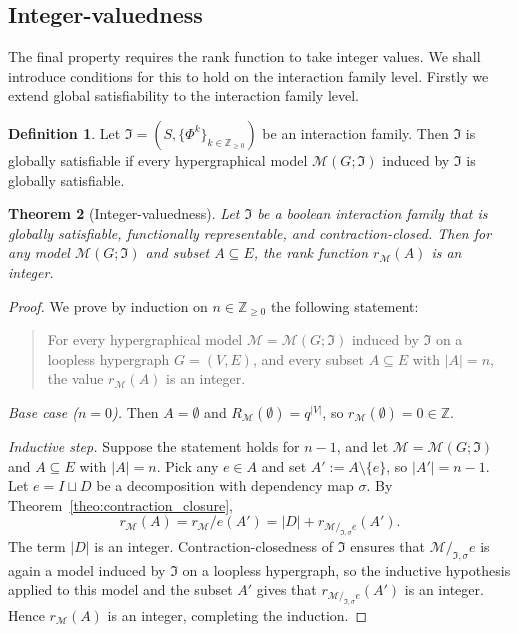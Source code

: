 \documentclass[11pt,reqno]{amsart}
\newcommand{\Mo}{\mathcal{M}}
\newcommand{\IFam}{\mathfrak{I}}
\theoremstyle{plain}
\newtheorem{theorem}{Theorem}[section]
\theoremstyle{definition}
\newtheorem{definition}[theorem]{Definition}
\numberwithin{equation}{section}
\begin{document}
\subsection{Integer-valuedness}
The final property requires the rank function to take integer values. We shall introduce conditions for this to hold on the interaction family level. Firstly we extend global satisfiability to the interaction family level.

\begin{definition}
    Let $\IFam = (S, \{\Phi^k\}_{k \in \mathbb{Z}_{\geq 0}})$ be an interaction family. Then $\IFam$ is globally satisfiable if every hypergraphical model $\Mo(G; \IFam)$ induced by $\IFam$ is globally satisfiable.
\end{definition}
 
\begin{theorem}[Integer-valuedness]
\label{thm:structural_integer_rank}
Let $\IFam$ be a boolean interaction family that is globally satisfiable, functionally representable, and contraction-closed.
Then for any model $\Mo(G; \IFam)$ and subset $A \subseteq E$, the rank function $r_{\Mo}(A)$ is an integer.
\end{theorem}
\begin{proof}
We prove by induction on $n \in \mathbb{Z}_{\geq 0}$ the following statement:
\begin{quote}
    For every hypergraphical model $\Mo = \Mo(G; \IFam)$ induced by $\IFam$ on a loopless hypergraph $G = (V, E)$, and every subset $A \subseteq E$ with $|A| = n$, the value $r_{\Mo}(A)$ is an integer.
\end{quote}

\emph{Base case ($n = 0$).} Then $A = \emptyset$ and $R_{\Mo}(\emptyset) = q^{|V|}$, so $r_{\Mo}(\emptyset) = 0 \in \mathbb{Z}$.

\emph{Inductive step.} Suppose the statement holds for $n - 1$, and let $\Mo = \Mo(G; \IFam)$ and $A \subseteq E$ with $|A| = n$. Pick any $e \in A$ and set $A' := A \setminus \{e\}$, so $|A'| = n - 1$. Let $e = I \sqcup D$ be a decomposition with dependency map $\sigma$. By Theorem~\ref{theo:contraction_closure},
\[
    r_{\Mo}(A) = r_{\Mo}/e(A') = |D| + r_{\Mo /_{\IFam,\sigma} e}(A').
\]
The term $|D|$ is an integer. Contraction-closedness of $\IFam$ ensures that $\Mo /_{\IFam,\sigma} e$ is again a model induced by $\IFam$ on a loopless hypergraph, so the inductive hypothesis applied to this model and the subset $A'$ gives that $r_{\Mo /_{\IFam,\sigma} e}(A')$ is an integer. Hence $r_{\Mo}(A)$ is an integer, completing the induction.
\end{proof}
\end{document}
